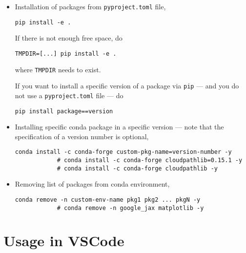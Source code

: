 \documentclass[12pt, a4paper]{scrbook}
\numberwithin{equation}{section}
\theoremstyle{definition}
\theoremstyle{definition}
\begin{document}
	\begin{itemize} 
	
		\item Installation of packages from \texttt{pyproject.toml} file, 
		
		\begin{lstlisting}[style=mystylebash, label=alg:pyproject_install, xleftmargin=\parindent]
			pip install -e .
		\end{lstlisting}
	
		If there is not enough free space, do
		
		\begin{lstlisting}[style=mystylebash, xleftmargin=\parindent]
			 TMPDIR=[...] pip install -e .
		\end{lstlisting}
		
		where \texttt{TMPDIR} needs to exist.
		
		If you want to install a specific version of a package via \texttt{pip} --- and you do not use a \texttt{pyproject.toml} file --- do
		
		\begin{lstlisting}[style=mystylebash, xleftmargin=\parindent]
			pip install package==version
		\end{lstlisting}
	
		\item Installing specific conda package in a specific version --- note that the specification of a version number is optional,
		
		\begin{lstlisting}[style=mystylebash, label=alg:conda__spec_env_version, xleftmargin=\parindent]
			conda install -c conda-forge custom-pkg-name=version-number -y
			# conda install -c conda-forge cloudpathlib=0.15.1 -y
			# conda install -c conda-forge cloudpathlib -y
		\end{lstlisting}
	
		\item Removing list of packages from conda environment,
		
		\begin{lstlisting}[style=mystylebash, xleftmargin=\parindent]
			conda remove -n custom-env-name pkg1 pkg2 ... pkgN -y
			# conda remove -n google_jax matplotlib -y
		\end{lstlisting}
		
	\end{itemize}

	\section{Usage in VSCode}
\end{document}
